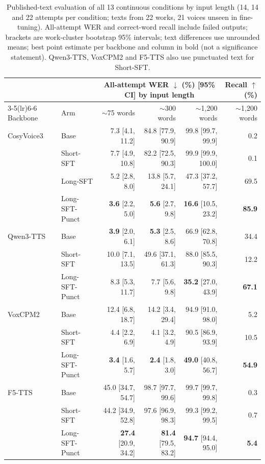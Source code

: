 \documentclass{article}
\newcommand{\best}[1]{\textcolor{resultgreen}{\textbf{#1}}}
\begin{document}
\begin{table}[t]
\caption{Published-text evaluation of all 13 continuous conditions by input length (14, 14 and 22 attempts per condition; texts from 22 works, 21 voices unseen in fine-tuning). All-attempt WER and correct-word recall include failed outputs; brackets are work-cluster bootstrap 95\% intervals; text differences use unrounded means; best point estimate per backbone and column in bold (not a significance statement). Qwen3-TTS, VoxCPM2 and F5-TTS also use punctuated text for Short-SFT.}
\label{tab:crossmodel}
\centering
\small
\renewcommand{\arraystretch}{0.88}
\setlength{\tabcolsep}{5pt}
\begin{tabular}{llrrrr}
\toprule
& & \multicolumn{3}{c}{All-attempt WER $\downarrow$ (\%) [95\% CI] by input length} & Recall $\uparrow$ (\%)\\
\cmidrule(lr){3-5}\cmidrule(lr){6-6}
Backbone & Arm & $\sim$75 words & $\sim$300 words & $\sim$1,200 words & $\sim$1,200 words\\
\midrule
CosyVoice3 & Base & 7.3 [4.1, 11.2] & 84.8 [77.9, 90.9] & 99.8 [99.7, 99.9] & 0.2\\
 & Short-SFT & 7.7 [4.9, 10.8] & 82.2 [72.5, 90.3] & 99.9 [99.9, 100.0] & 0.1\\
 & Long-SFT & 5.2 [2.8, 8.0] & 13.8 [5.7, 24.1] & 47.3 [37.2, 57.7] & 69.5\\
 & Long-SFT-Punct & \best{3.6} [2.2, 5.0] & \best{5.6} [2.7, 9.8] & \best{16.6} [10.5, 23.2] & \best{85.9}\\
\midrule
Qwen3-TTS & Base & \best{3.9} [2.0, 6.1] & \best{5.3} [2.5, 8.6] & 66.9 [62.8, 70.8] & 34.4\\
 & Short-SFT & 10.0 [7.1, 13.5] & 49.6 [37.1, 61.3] & 88.0 [85.5, 90.3] & 12.2\\
 & Long-SFT-Punct & 8.3 [5.3, 11.7] & 7.7 [5.6, 9.8] & \best{35.2} [27.0, 43.9] & \best{67.1}\\
\midrule
VoxCPM2 & Base & 12.4 [6.8, 18.7] & 14.2 [3.4, 29.4] & 94.9 [91.0, 98.0] & 5.2\\
 & Short-SFT & 4.4 [2.2, 6.9] & 4.1 [3.2, 4.9] & 90.5 [86.9, 93.9] & 10.5\\
 & Long-SFT-Punct & \best{3.4} [1.6, 5.7] & \best{2.4} [1.8, 3.0] & \best{49.0} [40.8, 56.7] & \best{54.9}\\
\midrule
F5-TTS & Base & 45.0 [34.7, 54.7] & 98.7 [97.7, 99.6] & 99.7 [99.7, 99.8] & 0.3\\
 & Short-SFT & 44.2 [34.9, 52.8] & 97.6 [96.9, 98.3] & 99.3 [99.2, 99.5] & 0.7\\
 & Long-SFT-Punct & \best{27.4} [20.9, 34.2] & \best{81.4} [79.5, 83.2] & \best{94.7} [94.4, 95.0] & \best{5.4}\\
\bottomrule
\end{tabular}
\end{table}
\end{document}
